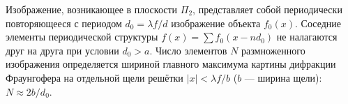 \begin{figure}[ht!]
\end{figure}

Изображение, возникающее в плоскости $\Pi_2$, представляет собой периодически повторяющееся с периодом $d_0 = \lambda f / d$ изображение объекта $f_0(x)$. Соседние элементы периодической структуры $f(x) = \sum f_0(x - nd_0)$ не налагаются друг на друга при условии $d_0 > a$. Число элементов $N$ размноженного изображения определяется шириной главного максимума картины дифракции Фраунгофера на отдельной щели решётки $|x| < \lambda f / b$ ($b$ --- ширина щели): $N \approx 2b / d_0$.
